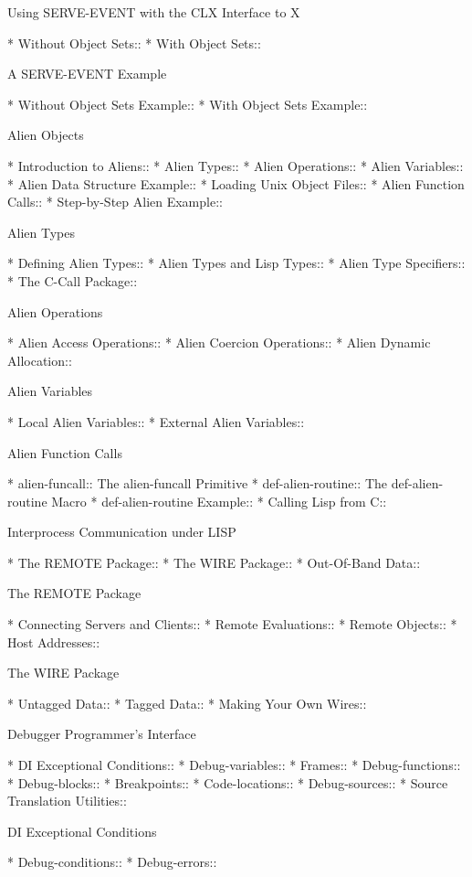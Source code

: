 \begin{menu}
Using SERVE-EVENT with the CLX Interface to X

* Without Object Sets::         
* With Object Sets::            

A SERVE-EVENT Example

* Without Object Sets Example::  
* With Object Sets Example::    

Alien Objects

* Introduction to Aliens::      
* Alien Types::                 
* Alien Operations::            
* Alien Variables::             
* Alien Data Structure Example::  
* Loading Unix Object Files::   
* Alien Function Calls::        
* Step-by-Step Alien Example::  

Alien Types

* Defining Alien Types::        
* Alien Types and Lisp Types::  
* Alien Type Specifiers::       
* The C-Call Package::          

Alien Operations

* Alien Access Operations::     
* Alien Coercion Operations::   
* Alien Dynamic Allocation::    

Alien Variables

* Local Alien Variables::       
* External Alien Variables::    

Alien Function Calls

* alien-funcall::               The alien-funcall Primitive
* def-alien-routine::           The def-alien-routine Macro
* def-alien-routine Example::   
* Calling Lisp from C::         

Interprocess Communication under LISP

* The REMOTE Package::          
* The WIRE Package::            
* Out-Of-Band Data::            

The REMOTE Package

* Connecting Servers and Clients::  
* Remote Evaluations::          
* Remote Objects::              
* Host Addresses::              

The WIRE Package

* Untagged Data::               
* Tagged Data::                 
* Making Your Own Wires::       

Debugger Programmer's Interface

* DI Exceptional Conditions::   
* Debug-variables::             
* Frames::                      
* Debug-functions::             
* Debug-blocks::                
* Breakpoints::                 
* Code-locations::              
* Debug-sources::               
* Source Translation Utilities::  

DI Exceptional Conditions

* Debug-conditions::            
* Debug-errors::                
\end{menu}

